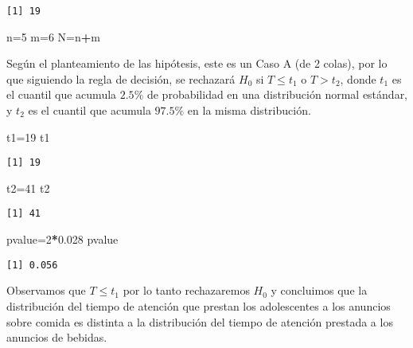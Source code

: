 \documentclass[
  a4paper,
  oneside,
  openany]{book}
\newenvironment{Shaded}{\begin{snugshade}}{\end{snugshade}}
\newcommand{\DecValTok}[1]{\textcolor[rgb]{0.00,0.00,0.81}{#1}}
\newcommand{\FloatTok}[1]{\textcolor[rgb]{0.00,0.00,0.81}{#1}}
\newcommand{\NormalTok}[1]{#1}
\newcommand{\OtherTok}[1]{\textcolor[rgb]{0.56,0.35,0.01}{#1}}
\newcommand{\SpecialCharTok}[1]{\textcolor[rgb]{0.81,0.36,0.00}{\textbf{#1}}}
\begin{document}
\begin{verbatim}
[1] 19
\end{verbatim}

\begin{Shaded}
\begin{Highlighting}[]
\NormalTok{n}\OtherTok{=}\DecValTok{5}
\NormalTok{m}\OtherTok{=}\DecValTok{6}
\NormalTok{N}\OtherTok{=}\NormalTok{n}\SpecialCharTok{+}\NormalTok{m}
\end{Highlighting}
\end{Shaded}

Según el planteamiento de las hipótesis, este es un Caso A (de 2 colas), por lo que siguiendo la regla de decisión, se rechazará \(H_0\) si \(T \leq t_1\) o \(T> t_2\), donde \(t_1\) es el cuantil que acumula \(2.5\%\) de probabilidad en una distribución normal estándar, y \(t_2\) es el cuantil que acumula \(97.5\%\) en la misma distribución.

\begin{Shaded}
\begin{Highlighting}[]
\NormalTok{t1}\OtherTok{=}\DecValTok{19}
\NormalTok{t1}
\end{Highlighting}
\end{Shaded}

\begin{verbatim}
[1] 19
\end{verbatim}

\begin{Shaded}
\begin{Highlighting}[]
\NormalTok{t2}\OtherTok{=}\DecValTok{41}
\NormalTok{t2}
\end{Highlighting}
\end{Shaded}

\begin{verbatim}
[1] 41
\end{verbatim}

\begin{Shaded}
\begin{Highlighting}[]
\NormalTok{pvalue}\OtherTok{=}\DecValTok{2}\SpecialCharTok{*}\FloatTok{0.028}
\NormalTok{pvalue}
\end{Highlighting}
\end{Shaded}

\begin{verbatim}
[1] 0.056
\end{verbatim}

Observamos que \(T \leq t_1\) por lo tanto rechazaremos \(H_0\) y concluimos que la distribución del tiempo de atención que prestan los adolescentes a los anuncios sobre comida es distinta a la distribución del tiempo de atención prestada a los anuncios de bebidas.
\end{document}

